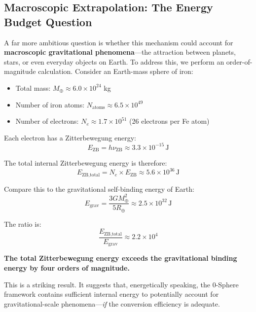 \documentclass[12pt,letterpaper]{article}
\begin{document}
\subsection{Macroscopic Extrapolation: The Energy Budget Question}
\label{subsec:macroscopic_extrapolation}

A far more ambitious question is whether this mechanism could account for \textbf{macroscopic gravitational phenomena}---the attraction between planets, stars, or even everyday objects on Earth. To address this, we perform an order-of-magnitude calculation. Consider an Earth-mass sphere of iron:
\begin{itemize}
\item Total mass: $M_\oplus \approx 6.0 \times 10^{24}$ kg
\item Number of iron atoms: $N_\text{atoms} \approx 6.5 \times 10^{49}$
\item Number of electrons: $N_e \approx 1.7 \times 10^{51}$ (26 electrons per Fe atom)
\end{itemize}

Each electron has a Zitterbewegung energy:
\begin{equation}
E_\text{ZB} = h \nu_\text{ZB} \approx 3.3 \times 10^{-15} \, \text{J}
\end{equation}

The total internal Zitterbewegung energy is therefore:
\begin{equation}
E_\text{ZB,total} = N_e \times E_\text{ZB} \approx 5.6 \times 10^{36} \, \text{J}
\end{equation}

Compare this to the gravitational self-binding energy of Earth:
\begin{equation}
E_\text{grav} = \frac{3GM_\oplus^2}{5R_\oplus} \approx 2.5 \times 10^{32} \, \text{J}
\end{equation}

The ratio is:
\begin{equation}
\frac{E_\text{ZB,total}}{E_\text{grav}} \approx 2.2 \times 10^4
\end{equation}

\textbf{The total Zitterbewegung energy exceeds the gravitational binding energy by four orders of magnitude.}

This is a striking result. It suggests that, energetically speaking, the 0-Sphere framework contains sufficient internal energy to potentially account for gravitational-scale phenomena---\textit{if} the conversion efficiency is adequate.
\end{document}
